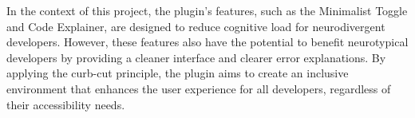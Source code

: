 In the context of this project, the plugin's features, such as the Minimalist Toggle and Code Explainer, are designed to reduce cognitive load for \gls{neurodivergent} developers. 
However, these features also have the potential to benefit neurotypical developers by providing a cleaner interface and clearer error explanations. By applying the curb-cut principle, 
the plugin aims to create an inclusive environment that enhances the user experience for all developers, regardless of their accessibility needs.
